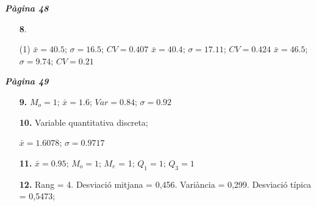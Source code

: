 \documentclass[a4paper, pdf, twoside]{book}
\begin{document}
\begin{multicols}{2}

{\textbf{\em Pàgina 48}} \hrulefill
\begin{enumerate}
\vspace{0.25cm}



 \item[\fontfamily{phv}\selectfont\color{blue}\textbf{8}. ]  \scalebox{0.6}{\simbolclau } 
 \begin{tasks}[column-sep=1em, item-indent=1.3333em](1)
	 \task* $\bar x=40.5$; $\sigma =16.5$; $CV=0.407$
	 \task* $\bar x=40.4$; $\sigma =17.11$; $CV=0.424$
	 \task* $\bar x=46.5$; $\sigma =9.74$; $CV=0.21$ \par {}
\end{tasks}
 \end{enumerate}
\vspace{0.3cm}


{\textbf{\em Pàgina 49}} \hrulefill
\begin{enumerate}
\vspace{0.25cm}
\item[\fontfamily{phv}\selectfont\color{blue}\textbf{9. }]  \scalebox{0.6}{\simbolclau } 
$M_o =1$; $\bar x=1.6$; $Var=0.84$; $\sigma =0.92$\par {}
 \end{enumerate}
\begin{enumerate}
\vspace{0.25cm}
\item[\fontfamily{phv}\selectfont\color{blue}\textbf{10. }]  \scalebox{0.6}{\simbolclau } 
Variable quantitativa discreta;\par $\bar x=1.6078$; $\sigma =0.9717$\par {}
\vspace{0.25cm}
\item[\fontfamily{phv}\selectfont\color{blue}\textbf{11. }]  \scalebox{0.6}{\simbolclau } 
$\bar x=0.95$; $M_o=1$; $M_e$ = 1; $Q_1 = 1$; $Q_3= 1$ \par {} 
\vspace{0.25cm}
\item[\fontfamily{phv}\selectfont\color{blue}\textbf{12. }] 
Rang = 4. Desviació mitjana = 0,456. Variància = 0,299. Desviació típica = 0,5473; \par {}
\vspace{0.25cm}



\end{enumerate}
\end{multicols}
\end{document}
